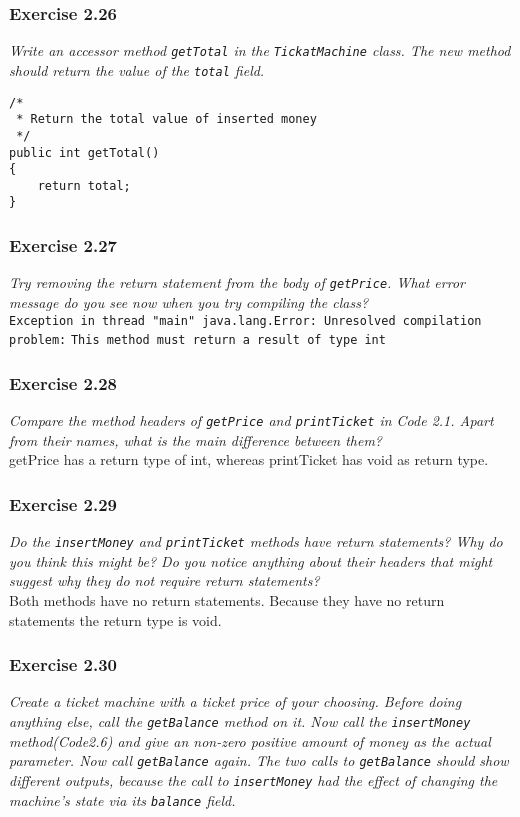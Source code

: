 \subsubsection*{Exercise 2.26}
\textit{Write an accessor method \lstinline?getTotal? in the 
\lstinline?TickatMachine? class. The new method should return the value of the 
\lstinline?total? field. }\\
\begin{lstlisting}[caption=Solution for Exercise 2.26 method getTotal]
/* 
 * Return the total value of inserted money
 */
public int getTotal()
{
	return total;
}
\end{lstlisting}

\subsubsection*{Exercise 2.27}
\textit{Try removing the return statement from the body of 
\lstinline?getPrice?. What error message do you see now when you try compiling 
the class? }\\
\lstinline{Exception in thread "main" java.lang.Error: Unresolved compilation problem:}
\lstinline{This method must return a result of type int}

\subsubsection*{Exercise 2.28}
\textit{Compare the method headers of \lstinline?getPrice? and 
\lstinline?printTicket? in Code 2.1. Apart from their names, what is the main 
difference between them? }\\
getPrice has a return type of int, whereas printTicket has void as return type. 

\subsubsection*{Exercise 2.29}
\textit{Do the \lstinline?insertMoney? and \lstinline?printTicket? methods have 
return statements? Why do you think this might be? Do you notice anything about 
their headers that might suggest why they do not require return statements? }\\
Both methods have no return statements. Because they have no return statements
the return type is void. 

\subsubsection*{Exercise 2.30}
\textit{Create a ticket machine with a ticket price of your choosing. Before 
doing anything else, call the \lstinline?getBalance? method on it. Now call the 
\lstinline?insertMoney? method(Code2.6) and give an non-zero positive amount of 
money as the actual parameter. Now call \lstinline?getBalance? again. The two 
calls to \lstinline?getBalance? should show different outputs, because the call 
to \lstinline?insertMoney? had the effect of changing the machine's state via 
its \lstinline?balance? field. }\\

